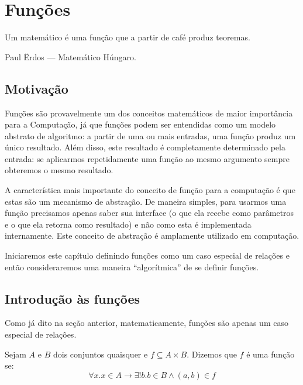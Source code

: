 \chapter{Funções}\label{cap8}

\epigraph{Um matemático é uma função que a partir de café produz
  teoremas.}{Paul Ërdos --- Matemático Húngaro.}

\section{Motivação}

Funções são provavelmente um dos conceitos matemáticos de maior
importância para a Computação, já que funções podem ser entendidas
como um modelo abstrato de algoritmo: a partir de uma ou mais
entradas, uma função produz um único resultado. Além disso, este
resultado é completamente determinado pela entrada: se aplicarmos
repetidamente uma função ao mesmo argumento sempre obteremos o mesmo
resultado.

A característica mais importante do conceito de função para a
computação é que estas são um mecanismo de abstração. De maneira
simples, para usarmos uma função precisamos apenas saber sua interface
(o que ela recebe como parâmetros e o que ela retorna como resultado)
e não como esta é implementada internamente. Este conceito de
abstração é amplamente utilizado em computação.

Iniciaremos este capítulo definindo funções como um caso especial de
relações e então consideraremos uma maneira ``algorítmica'' de se
definir funções.

\section{Introdução às funções}

Como já dito na seção anterior, matematicamente, funções são apenas um
caso especial de relações.

\begin{Definition}[Função]
Sejam $A$ e $B$ dois conjuntos quaisquer e $f \subseteq A \times
B$. Dizemos que $f$ é uma função se:
\[
\forall x. x\in A \to \exists ! b. b\in B \land (a,b) \in f
\]
\end{Definition}

